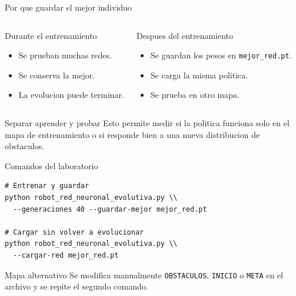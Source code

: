 \documentclass[aspectratio=169,11pt]{beamer}
\begin{document}
\begin{frame}{Por que guardar el mejor individuo}
  \begin{columns}[T]
      \begin{block}{Durante el entrenamiento}
        \begin{itemize}
          \item Se prueban muchas redes.
          \item Se conserva la mejor.
          \item La evolucion puede terminar.
        \end{itemize}
      \end{block}
      \begin{block}{Despues del entrenamiento}
        \begin{itemize}
          \item Se guardan los pesos en \texttt{mejor\_red.pt}.
          \item Se carga la misma politica.
          \item Se prueba en otro mapa.
        \end{itemize}
      \end{block}
  \end{columns}
  \vspace{0.25cm}
  \begin{alertblock}{Separar aprender y probar}
    Esto permite medir si la politica funciona solo en el mapa de entrenamiento o si responde bien a una nueva distribucion de obstaculos.
  \end{alertblock}
\end{frame}

\begin{frame}[fragile]{Comandos del laboratorio}
\begin{lstlisting}[style=python]
# Entrenar y guardar
python robot_red_neuronal_evolutiva.py \\
  --generaciones 40 --guardar-mejor mejor_red.pt

# Cargar sin volver a evolucionar
python robot_red_neuronal_evolutiva.py \\
  --cargar-red mejor_red.pt
\end{lstlisting}
  \begin{block}{Mapa alternativo}
    Se modifica manualmente \texttt{OBSTACULOS}, \texttt{INICIO} o \texttt{META} en el archivo y se repite el segundo comando.
  \end{block}
\end{frame}
\end{document}
